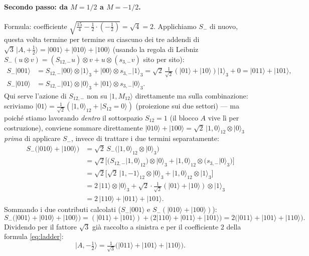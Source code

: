 \documentclass[11pt,a4paper]{article}
\newcommand{\ket}[1]{\lvert #1\rangle}
\begin{document}
\paragraph{Secondo passo: da $M{=}1/2$ a $M{=}{-}1/2$.} Formula: coefficiente
$\sqrt{\tfrac{15}{4}-\tfrac12\cdot({-}\tfrac12)}=\sqrt{4}=2$. Applichiamo $S_-$
di nuovo, questa volta termine per termine su ciascuno dei tre addendi di
$\sqrt3\,\ket{A,+\tfrac12}=\ket{001}+\ket{010}+\ket{100}$ (usando la
regola di Leibniz $S_-(u\otimes v)=(S_{12,-}u)\otimes v+u\otimes(s_{3,-}v)$
sito per sito):
\begin{align*}
S_-\ket{001} &= S_{12,-}\ket{00}\otimes\ket1_3 + \ket{00}\otimes s_{3,-}\ket1_3
= \sqrt2\,\tfrac{1}{\sqrt2}(\ket{01}{+}\ket{10})\ket1_3 + 0
= \ket{011}+\ket{101},\\
S_-\ket{010} &= S_{12,-}\ket{01}\otimes\ket0_3 + \ket{01}\otimes s_{3,-}\ket0_3.
\end{align*}
Qui serve l'azione di $S_{12,-}$ non su $\ket{1,M_{12}}$ direttamente ma sulla
combinazione: scriviamo $\ket{01}=\tfrac1{\sqrt2}(\ket{1,0}_{12}+\ket{S_{12}=0})$
(proiezione sui due settori) — ma poiché stiamo lavorando \emph{dentro} il
sottospazio $S_{12}=1$ (il blocco $A$ vive lì per costruzione), conviene
sommare direttamente $\ket{010}+\ket{100}=\sqrt2\,\ket{1,0}_{12}\otimes\ket0_3$
\emph{prima} di applicare $S_-$, invece di trattare i due termini separatamente:
\begin{align*}
S_-\big(\ket{010}+\ket{100}\big) &= \sqrt2\,S_-\big(\ket{1,0}_{12}\otimes\ket0_3\big)\\
&= \sqrt2\Big[\big(S_{12,-}\ket{1,0}_{12}\big)\otimes\ket0_3 + \ket{1,0}_{12}\otimes\big(s_{3,-}\ket0_3\big)\Big]\\
&= \sqrt2\Big[\sqrt2\,\ket{1,{-}1}_{12}\otimes\ket0_3 + \ket{1,0}_{12}\otimes\ket1_3\Big]\\
&= 2\,\ket{11}\otimes\ket0_3 + \sqrt2\cdot\tfrac{1}{\sqrt2}(\ket{01}{+}\ket{10})\otimes\ket1_3\\
&= 2\,\ket{110} + \ket{011}+\ket{101}.
\end{align*}
Sommando i due contributi calcolati ($S_-\ket{001}$ e $S_-(\ket{010}+\ket{100})$):
\begin{equation*}
S_-\big(\ket{001}+\ket{010}+\ket{100}\big) = (\ket{011}+\ket{101}) + \big(2\ket{110}+\ket{011}+\ket{101}\big)
= 2\big(\ket{011}+\ket{101}+\ket{110}\big).
\end{equation*}
Dividendo per il fattore $\sqrt3$ già raccolto a sinistra e per il coefficiente
$2$ della formula \eqref{eq:ladder}:
\begin{equation}
\ket{A,{-}\tfrac12} = \tfrac{1}{\sqrt3}\big(\ket{011}+\ket{101}+\ket{110}\big).
\label{eq:Am12}
\end{equation}
\end{document}

